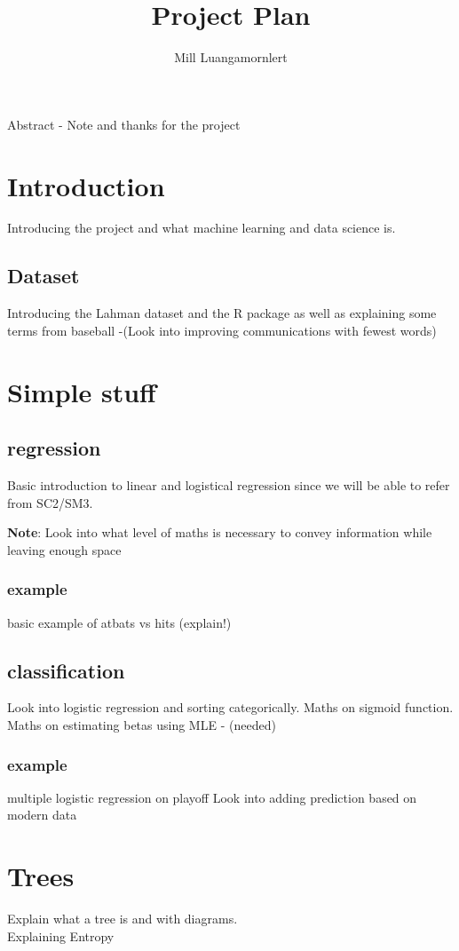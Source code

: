 \documentclass[11pt,a4paper]{article}
\title{Project Plan}
\author{Mill Luangamornlert}
\begin{document}
\maketitle
Abstract - Note and thanks for the project
\section{Introduction}
Introducing the project and what machine learning and data science is.

\subsection{Dataset}
Introducing the Lahman dataset and the R package as well as explaining some terms from baseball -(Look into improving communications with fewest words)

\section{Simple stuff}
\subsection{regression}
Basic introduction to linear and logistical regression since we will be able to refer from SC2/SM3. 

\textbf{Note}: Look into what level of maths is necessary to convey information while leaving enough space

\subsubsection{example}
basic example of atbats vs hits (explain!)

\subsection{classification}
Look into logistic regression and sorting categorically.
Maths on sigmoid function.
Maths on estimating betas using MLE - (needed)

\subsubsection{example}
multiple logistic regression on playoff
Look into adding prediction based on modern data

\section{Trees}
Explain what a tree is and with diagrams. \\
Explaining Entropy
\end{document}
